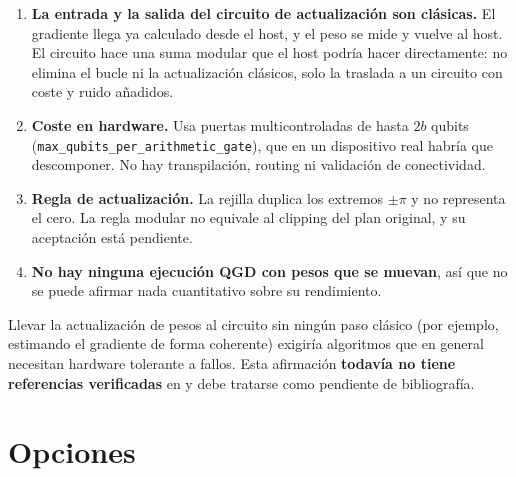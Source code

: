 \documentclass[11pt,a4paper]{article}
\begin{document}
\begin{warnbox}
\begin{enumerate}[leftmargin=*]
  \item \textbf{La entrada y la salida del circuito de actualización son clásicas.} El gradiente llega ya calculado
        desde el host, y el peso se mide y vuelve al host. El circuito hace una suma modular que el host podría hacer
        directamente: no elimina el bucle ni la actualización clásicos, solo la traslada a un circuito con coste y
        ruido añadidos.
  \item \textbf{Coste en hardware.} Usa puertas multicontroladas de hasta $2b$ qubits
        (\texttt{max\_qubits\_per\_arithmetic\_gate}), que en un dispositivo real habría que descomponer. No hay
        transpilación, routing ni validación de conectividad.
  \item \textbf{Regla de actualización.} La rejilla duplica los extremos $\pm\pi$ y no representa el cero. La regla
        modular no equivale al clipping del plan original, y su aceptación está pendiente.
  \item \textbf{No hay ninguna ejecución QGD con pesos que se muevan}, así que no se puede afirmar nada cuantitativo
        sobre su rendimiento.
\end{enumerate}
\end{warnbox}

Llevar la actualización de pesos al circuito sin ningún paso clásico (por ejemplo, estimando el gradiente de forma
coherente) exigiría algoritmos que en general necesitan hardware tolerante a fallos. Esta afirmación
\textbf{todavía no tiene referencias verificadas} en  y debe tratarse como pendiente de
bibliografía.

\section{Opciones}
\end{document}
